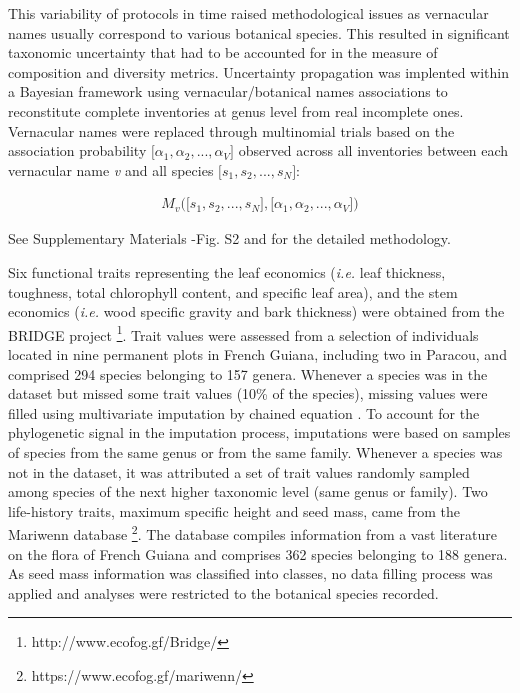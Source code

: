 \documentclass[fleqn,10pt]{ArtEcoFoG} %
\begin{document}
This variability of protocols in time raised methodological issues as
vernacular names usually correspond to various botanical species. This
resulted in significant taxonomic uncertainty that had to be accounted
for in the measure of composition and diversity metrics. Uncertainty
propagation was implented within a Bayesian framework using
vernacular/botanical names associations to reconstitute complete
inventories at genus level from real incomplete ones. Vernacular names
were replaced through multinomial trials based on the association
probability \(\big[\alpha_1, \alpha_2,..., \alpha_V\big]\) observed
across all inventories between each vernacular name \emph{v} and all
species \(\big[s_1, s_2,..., s_N\big]\):

\begin{align}
M_v\Big(\big[s_1, s_2,..., s_N\big],\big[\alpha_1, \alpha_2,..., \alpha_V\big]\Big) \nonumber
\end{align}

See Supplementary Materials -Fig. S2 and \citet{Aubry-Kientz2013} for
the detailed methodology.

Six functional traits representing the leaf economics (\emph{i.e.} leaf
thickness, toughness, total chlorophyll content, and specific leaf
area), and the stem economics (\emph{i.e.} wood specific gravity and
bark thickness) were obtained from the BRIDGE project \footnote{http://www.ecofog.gf/Bridge/}.
Trait values were assessed from a selection of individuals located in
nine permanent plots in French Guiana, including two in Paracou, and
comprised 294 species belonging to 157 genera. Whenever a species was in
the dataset but missed some trait values (10\% of the species), missing
values were filled using multivariate imputation by chained equation
\citep{Mice2011}. To account for the phylogenetic signal in the
imputation process, imputations were based on samples of species from
the same genus or from the same family. Whenever a species was not in
the dataset, it was attributed a set of trait values randomly sampled
among species of the next higher taxonomic level (same genus or family).
Two life-history traits, maximum specific height and seed mass, came
from the Mariwenn database \footnote{https://www.ecofog.gf/mariwenn/}.
The database compiles information from a vast literature on the flora of
French Guiana \citep{Ollivier2007} and comprises 362 species belonging
to 188 genera. As seed mass information was classified into classes, no
data filling process was applied and analyses were restricted to the
botanical species recorded.
\end{document}
